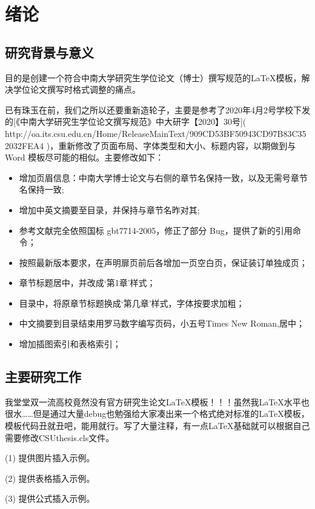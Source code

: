 \section{绪论}
\subsection{研究背景与意义}

目的是创建一个符合中南大学研究生学位论文（博士）撰写规范的LaTeX模板，解决学位论文撰写时格式调整的痛点。

已有珠玉在前，我们之所以还要重新造轮子，主要是参考了2020年4月2号学校下发的[《中南大学研究生学位论文撰写规范》中大研字【2020】30号]( http://oa.its.csu.edu.cn/Home/ReleaseMainText/909CD53BF50943CD97B83C352032FEA4 )，重新修改了页面布局、字体类型和大小、标题内容，以期做到与 Word 模板尽可能的相似。主要修改如下：
\begin{itemize}
\item 增加页眉信息：中南大学博士论文与右侧的章节名保持一致，以及无需号章节名保持一致;
\item 增加中英文摘要至目录，并保持与章节名昨对其;
\item 参考文献完全依照国标 gbt7714-2005，修正了部分 Bug，提供了新的引用命令；
\item 按照最新版本要求，在声明扉页前后各增加一页空白页，保证装订单独成页；
\item 章节标题居中，并改成‘第1章’样式；
\item 目录中，将原章节标题换成‘第几章’样式，字体按要求加粗；
\item 中文摘要到目录结束用罗马数字编写页码，小五号Times New Roman,居中；
\item 增加插图索引和表格索引；
\end{itemize}

\subsection{主要研究工作}
我堂堂双一流高校竟然没有官方研究生论文LaTeX模板！！！虽然我LaTeX水平也很水……但是通过大量debug也勉强给大家凑出来一个格式绝对标准的LaTeX模板，模板代码丑就丑吧，能用就行。写了大量注释，有一点LaTeX基础就可以根据自己需要修改CSUthesis.cls文件。

(1) 提供图片插入示例。

(2) 提供表格插入示例。

(3) 提供公式插入示例。

